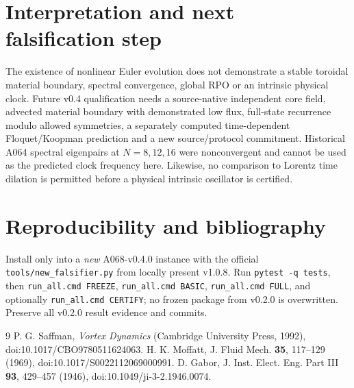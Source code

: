 \documentclass[11pt,a4paper]{article}
\begin{document}
\section{Interpretation and next falsification step}
The existence of nonlinear Euler evolution does not demonstrate a stable toroidal material boundary, spectral convergence, global RPO or an intrinsic physical clock. Future v0.4 qualification needs a source-native independent core field, advected material boundary with demonstrated low flux, full-state recurrence modulo allowed symmetries, a separately computed time-dependent Floquet/Koopman prediction and a new source/protocol commitment. Historical A064 spectral eigenpairs at $N=8,12,16$ were nonconvergent and cannot be used as the predicted clock frequency here. Likewise, no comparison to Lorentz time dilation is permitted before a physical intrinsic oscillator is certified.

\section{Reproducibility and bibliography}
Install only into a \emph{new} A068-v0.4.0 instance with the official \texttt{tools/new\_falsifier.py} from locally present v1.0.8. Run \texttt{pytest -q tests}, then \texttt{run\_all.cmd FREEZE}, \texttt{run\_all.cmd BASIC}, \texttt{run\_all.cmd FULL}, and optionally \texttt{run\_all.cmd CERTIFY}; no frozen package from v0.2.0 is overwritten. Preserve all v0.2.0 result evidence and commits.\par
\begin{thebibliography}{9}
 P. G. Saffman, \emph{Vortex Dynamics} (Cambridge University Press, 1992), doi:10.1017/CBO9780511624063.
 H. K. Moffatt, J. Fluid Mech. \textbf{35}, 117--129 (1969), doi:10.1017/S0022112069000991.
 D. Gabor, J. Inst. Elect. Eng. Part III \textbf{93}, 429--457 (1946), doi:10.1049/ji-3-2.1946.0074.
\end{thebibliography}
\end{document}
